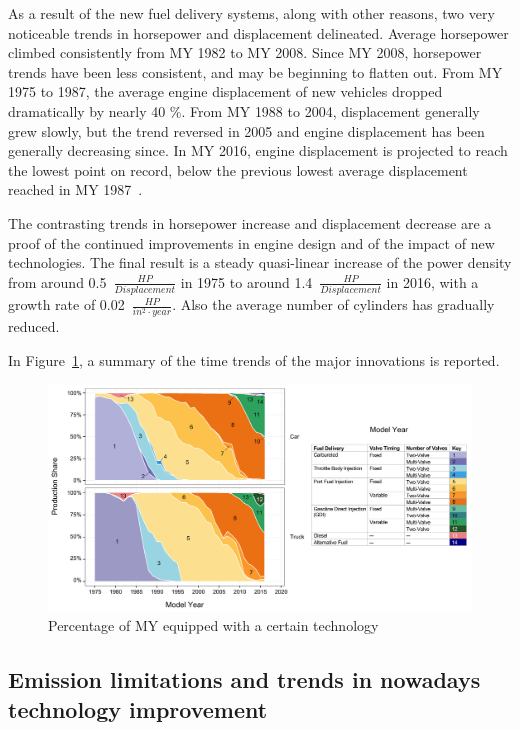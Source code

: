 As a result of the new fuel delivery systems, along with other reasons, two very noticeable trends in horsepower and displacement delineated. Average horsepower climbed consistently from MY 1982 to MY 2008. Since MY 2008, horsepower trends have been less consistent, and may be beginning to flatten out. From MY 1975 to 1987, the average engine displacement of new vehicles dropped dramatically by nearly 40 \%. From MY 1988 to 2004, displacement generally grew slowly, but the trend reversed in 2005 and engine displacement has been generally decreasing since. In MY 2016, engine displacement is projected to reach the lowest point on record, below the previous lowest average displacement reached in MY 1987~\cite{EPA2016}.

The contrasting trends in horsepower increase and displacement decrease are a proof of the continued improvements in engine design and of the impact of new technologies. The final result is a steady quasi-linear increase of the power density from around 0.5~$\frac{HP}{Displacement}$ in 1975 to around 1.4~$\frac{HP}{Displacement}$ in 2016, with a growth rate of 0.02~$\frac{HP}{in^{2} \cdot year}$. Also the average number of cylinders has gradually reduced.

In Figure~\ref{fig:technology_trends}, a summary of the time trends of the major innovations is reported.

\begin{figure}[ht]
  \centering  \includegraphics[width=\textwidth]{figures/review/technology_trends.png}
  \caption{Percentage of MY equipped with a certain technology  \label{fig:technology_trends} }
\end{figure}


\subsection{Emission limitations and trends in nowadays technology improvement}
\label{sec:technology_improvements}

